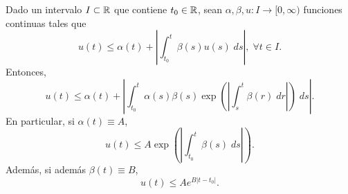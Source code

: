 \begin{lema}
Dado un intervalo $\displaystyle I \subset \mathbb{R} $ que contiene $\displaystyle t_{0} \in \mathbb{R} $, sean $\displaystyle \alpha, \beta, u : I \to [0, \infty) $ funciones continuas tales que 
\[u\left(t\right)\leq \alpha\left(t\right) + \left|\int^{t}_{t_{0}} \beta\left(s\right)u\left(s\right) \; d s\right|, \; \forall t \in I .\]
Entonces, 
\[u\left(t\right)\leq \alpha\left(t\right) + \left|\int^{t}_{t_{0}} \alpha\left(s\right)\beta\left(s\right)\exp\left( \left|\int^{t}_{s} \beta\left(r\right) \; dr\right|\right) \; d s\right| .\]
En particular, si $\displaystyle \alpha\left(t\right)\equiv A $,
\[u\left(t\right)\leq A\exp\left( \left|\int^{t}_{t_{0}} \beta\left(s\right) \; d s\right|\right) .\]
Además, si además $\displaystyle \beta\left(t\right)\equiv B $,
\[u\left(t\right)\leq Ae^{B \left|t-t_{0}\right|} .\]
\end{lema}
